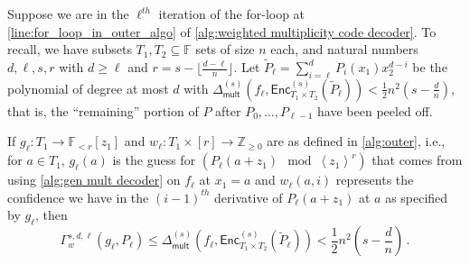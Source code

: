 \documentclass{theoretics}
\def\Integer{\mathbb{Z}}
\def\Field{\mathbb{F}}
\let\Z\Integer
\let\F\Field
\renewcommand{\tilde}[1]{\widetilde{#1}}
\newcommand{\ip}[1]{\left\langle #1 \right\rangle}
\newcommand{\enc}{{\mathsf{Enc}}}
\newcommand{\Delm}{\Delta_{\mathsf{mult}}}
\begin{document}
	\begin{lemma}\label{lem: gamma comparison to usual distance}
		Suppose we are in the $\ell^{th}$ iteration of the for-loop at \cref{line:for_loop_in_outer_algo} of \cref{alg:weighted multiplicity code decoder}.
		To recall, we have subsets $T_1, T_2 \subseteq \F$  sets of size $n$ each, and natural numbers $d, \ell, s, r$  with $d \geq \ell$ and $r = s - \lfloor \frac{d-\ell}{n} \rfloor$. 
		Let $\tilde{P}_\ell = \sum_{i = \ell}^d P_i(x_1)x_2^{d-i}$ be the polynomial of degree at most $d$ with $\Delm^{(s)}(f_\ell,\enc^{(s)}_{T_1\times T_2}(\tilde{P}_\ell)) < \frac{1}{2} n^2 (s-\frac{d}{n})$, that is, the ``remaining'' portion of $P$ after $P_0, \dotsc, P_{\ell-1}$ have been peeled off.
		
		If $g_{\ell}\colon  T_1 \to \F_{<r}[z_1]$ and $w_{\ell}\colon  T_1 \times [r] \to \Z_{\geq 0}$ are  as defined in \cref{alg:outer}, i.e., for $a\in T_1$, $g_\ell(a)$ is the guess for $(P_{\ell}(a+z_1) \mod \ip{z_1}^r)$ that comes from using \cref{alg:gen mult decoder} on $f_\ell$ at $x_1=a$ and $w_\ell(a,i)$ represents the confidence we have in the $(i-1)^{th}$ derivative of $P_\ell(a+z_1)$ at $a$ as specified by $g_\ell$,  then 
		\[
		\Gamma_{w}^{s, d, \ell}(g_{\ell}, P_{\ell}) \leq \Delm^{(s)}(f_\ell, \enc^{(s)}_{T_1\times T_2}(\tilde{P}_\ell)) < \frac{1}{2}n^2\left(s - \frac{d}{n}\right) \, .
		\]
	\end{lemma}
	
\end{document}
